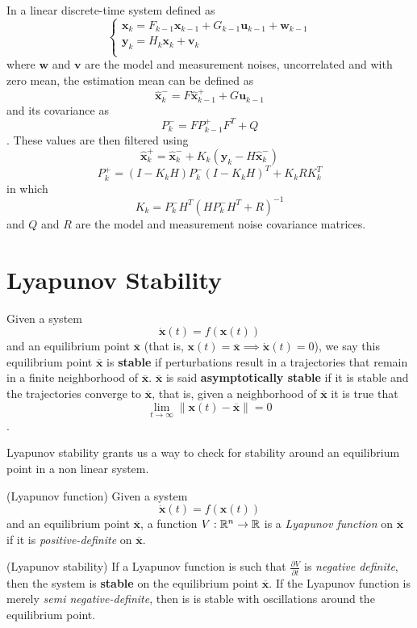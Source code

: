 \documentclass[a4paper]{report}
\begin{document}
In a linear discrete-time system defined as \[
    \begin{cases}
        \bm{x}_k = F_{k-1}\bm{x}_{k-1} + G_{k-1}\bm{u}_{k-1} + \bm{w}_{k-1} \\
	\bm{y}_k = H_k\bm{x}_k + \bm{v}_k \\
    \end{cases}
\] where $\bm{w}$ and $\bm{v}$ are the model and measurement noises, uncorrelated and with zero mean, the estimation mean can be defined as \[
\bm{\hat{x}}_k^{-} = F\bm{\hat{x}}_{k-1}^{+} + G\bm{u}_{k-1}
\] and its covariance as \[
P_k^{-} = FP_{k-1}^{+}F^{T} + Q
\]. These values are then filtered using \[
\bm{\hat{x}}_k^{+} = \bm{\hat{x}}_k^{-} + K_k\left( \bm{y}_k - H\bm{\hat{x}}_k^{-} \right) 
\] \[
P_k^{+} = \left( I - K_kH \right) P_k^{-}\left( I-K_kH \right) ^{T} + K_kRK_k^{T}
\] in which \[
K_k = P_k^{-}H^{T}\left( HP_k^{-}H^{T} + R \right) ^{-1}
\] and $Q$ and $R$ are the model and measurement noise covariance matrices.

\section*{Lyapunov Stability}

\begin{definition}
Given a system \[
\bm{\dot{x}}(t) = f\left( \bm{x}(t) \right) 
\] and an equilibrium point $\bm{\overline{x}}$ (that is, $\bm{x}(t) = \bm{\overline{x}}\implies\bm{\dot{x}}(t) = 0$), we say this equilibrium point $\bm{\overline{x}}$ is \textbf{stable} if perturbations result in a trajectories that remain in a finite neighborhood of $\bm{\overline{x}}$. $\bm{\overline{x}}$ is said \textbf{asymptotically stable} if it is stable and the trajectories converge to $\bm{\overline{x}}$, that is, given a neighborhood of $\bm{\overline{x}}$ it is true that \[
\lim_{t \to \infty}  \|\bm{x}(t) - \bm{\overline{x}}\|=0
\].
\end{definition}

Lyapunov stability grants us a way to check for stability around an equilibrium point in a non linear system.

\begin{definition}
    (Lyapunov function) Given a system \[
    \bm{\dot{x}}(t) = f\left( \bm{x}(t) \right) 
\] and an equilibrium point $\bm{\overline{x}}$, a function $V:\mathbb{R}^{n}\to \mathbb{R}$ is a \emph{Lyapunov function} on $\bm{\overline{x}}$ if it is \emph{positive-definite} on $\bm{\overline{x}}$.

    (Lyapunov stability) If a Lyapunov function is such that $\frac{\partial V}{\partial t}$ is \emph{negative definite}, then the system is \textbf{stable} on the equilibrium point $\bm{\overline{x}}$. If the Lyapunov function is merely \emph{semi negative-definite}, then is is stable with oscillations around the equilibrium point.
\end{definition}
\end{document}
